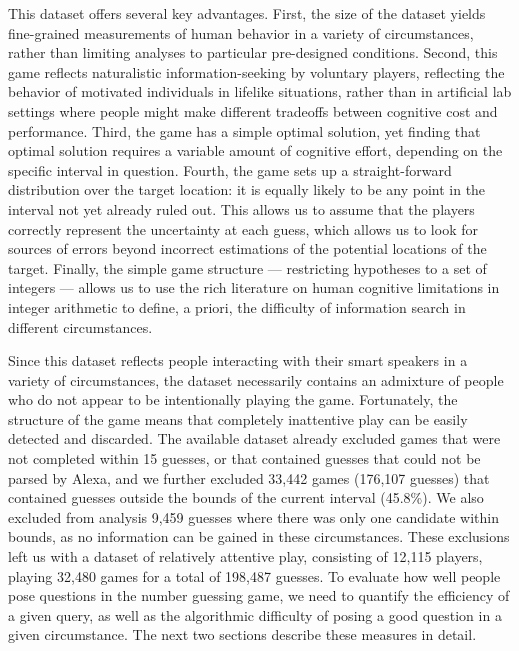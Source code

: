 \documentclass[10pt,letterpaper]{article}
\begin{document}
This dataset offers several key advantages. 
First, the size of the dataset yields fine-grained measurements of human behavior in a variety of circumstances, rather than limiting analyses to particular pre-designed conditions.
Second, this game reflects naturalistic information-seeking by voluntary players, reflecting the behavior of motivated individuals in lifelike situations, rather than in artificial lab settings where people might make different tradeoffs between cognitive cost and performance.
Third, the game has a simple optimal solution, yet finding that optimal solution requires a variable amount of cognitive effort, depending on the specific interval in question. 
Fourth, the game sets up a straight-forward distribution over the target location: it is equally likely to be any point in the interval not yet already ruled out. This allows us to assume that the players correctly represent the uncertainty at each guess, which allows us to look for sources of errors beyond incorrect estimations of the potential locations of the target. 
Finally, the simple game structure --- restricting hypotheses to a set of integers --- allows us to use the rich literature on human cognitive limitations in integer arithmetic to define, a priori, the difficulty of information search in different circumstances.

Since this dataset reflects people interacting with their smart speakers in a variety of circumstances, the dataset necessarily contains an admixture of people who do not appear to be intentionally playing the game. 
Fortunately, the structure of the game means that completely inattentive play can be easily detected and discarded.
The available dataset already excluded games that were not completed within 15 guesses, or that contained guesses that could not be parsed by Alexa, and we further excluded 33,442 games (176,107 guesses) that contained guesses outside the bounds of the current interval (45.8\%). We also excluded from analysis 9,459 guesses where there was only one candidate within bounds, as no information can be gained in these circumstances.
These exclusions left us with a dataset of relatively attentive play, consisting of 12,115 players, playing 32,480 games for a total of 198,487 guesses.
To evaluate how well people pose questions in the number guessing game, we need to quantify the efficiency of a given query, as well as the algorithmic difficulty of posing a good question in a given circumstance. The next two sections describe these measures in detail.
\end{document}
